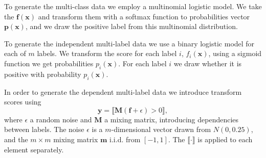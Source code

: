 \documentclass{article}
\renewcommand{\vec}[1]{\boldsymbol{#1}}
\newcommand{\bx}{\vec{x}}
\newcommand{\by}{\vec{y}}
\newcommand{\assert}[1]{\llbracket #1 \rrbracket}
\begin{document}
To generate the multi-class data we employ a multinomial logistic model. We take the $\boldsymbol{f}(\bx)$ and transform them with a softmax function to probabilities vector $\boldsymbol{p}(\bx)$, and we draw the positive label from this multinomial distribution.

To generate the independent multi-label data we use a binary logistic model for each of $m$ labels. We transform the score for each label $i$, $f_i(\bx)$, using a sigmoid function we get probabilities $p_i(\bx)$. For each label $i$ we draw whether it is positive with probability $p_i(\bx)$.    

In order to generate the dependent multi-label data we introduce transform scores using 
\begin{equation*}
\by = \assert{\boldsymbol{M} (\boldsymbol{f} +  \epsilon ) >  0  },
\end{equation*}
where $\epsilon$ a random noise and $\boldsymbol{M}$ a mixing matrix, introducing dependencies between labels. The noise $\epsilon$ is a $m$-dimensional vector drawn from $N(0, 0.25)$, and the $m \times m$ mixing matrix $\boldsymbol{m}$ i.i.d. from $[-1, 1]$. The $\assert{\cdot}$ is applied to each element separately.
\end{document}
